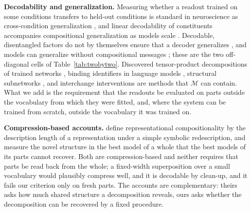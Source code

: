 \documentclass[10pt]{article}
\theoremstyle{plain}
\theoremstyle{remark}
\newcommand{\M}{\mathcal{M}}
\begin{document}
\textbf{Decodability and generalization.} Measuring whether a readout trained on some conditions transfers to held-out conditions is standard in neuroscience as cross-condition generalization \citep{bernardi2020,ito2022}, and linear decodability of constituents accompanies compositional generalization as models scale \citep{redhardt2025}. Decodable, disentangled factors do not by themselves ensure that a decoder generalizes \citep{montero2021,schott2022}, and models can generalize without compositional messages \citep{chaabouni2020}; these are the two off-diagonal cells of Table~\ref{tab:twobytwo}. Discovered tensor-product decompositions of trained networks \citep{mccoy2019,soulos2020}, binding identifiers in language models \citep{feng2024}, structural subnetworks \citep{lepori2023}, and interchange interventions \citep{geiger2021,geiger2024das} are methods that $\M$ can contain. What we add is the requirement that the readouts be evaluated on parts outside the vocabulary from which they were fitted, and, where the system can be trained from scratch, outside the vocabulary it was trained on.

\textbf{Compression-based accounts.} \citet{elmoznino2024} define representational compositionality by the description length of a representation under a simple symbolic redescription, and \citet{elmoznino2026} measure the novel structure in the best model of a whole that the best models of its parts cannot recover. Both are compression-based and neither requires that parts be read back from the whole; a fixed-width superposition over a small vocabulary would plausibly compress well, and it is decodable by clean-up, and it fails our criterion only on fresh parts. The accounts are complementary: theirs asks how much shared structure a decomposition reveals, ours asks whether the decomposition can be recovered by a fixed procedure.
\end{document}
